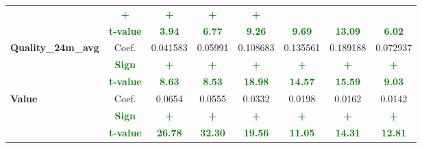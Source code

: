 \documentclass[11pt,english,a4paper,hidelinks]{book}
\begin{document}
\begin{table}[H]
\begin{tabular}{lccccccc}
                     & \textbf{\textcolor{green}{+}}
                     & \textbf{\textcolor{green}{+}}
                     & \textbf{\textcolor{green}{+}}
                     & \textbf{\textcolor{green}{+}} \\
            & \textbf{\textcolor{green}{t-value}}
                     & \textbf{\textcolor{green}{3.94}}
                     & \textbf{\textcolor{green}{6.77}}
                     & \textbf{\textcolor{green}{9.26}}
                     & \textbf{\textcolor{green}{9.69}}
                     & \textbf{\textcolor{green}{13.09}}
                     & \textbf{\textcolor{green}{6.02}} \\
        \midrule
        \multirow{3}{*}{\textbf{Quality\_24m\_avg}}
            & Coef.   & 0.041583  & 0.05991   & 0.108683  & 0.135561  & 0.189188  & 0.072937  \\
            & \textbf{\textcolor{green}{Sign}}
                     & \textbf{\textcolor{green}{+}}
                     & \textbf{\textcolor{green}{+}}
                     & \textbf{\textcolor{green}{+}}
                     & \textbf{\textcolor{green}{+}}
                     & \textbf{\textcolor{green}{+}}
                     & \textbf{\textcolor{green}{+}} \\
            & \textbf{\textcolor{green}{t-value}}
                     & \textbf{\textcolor{green}{8.63}}
                     & \textbf{\textcolor{green}{8.53}}
                     & \textbf{\textcolor{green}{18.98}}
                     & \textbf{\textcolor{green}{14.57}}
                     & \textbf{\textcolor{green}{15.59}}
                     & \textbf{\textcolor{green}{9.03}} \\
        \midrule
        \multirow{3}{*}{\textbf{Value}} 
            & Coef.   & 0.0654  & 0.0555  & 0.0332  & 0.0198  & 0.0162  & 0.0142 \\
            & \textbf{\textcolor{green}{Sign}}    & \textbf{\textcolor{green}{+}}       & \textbf{\textcolor{green}{+}}       & \textbf{\textcolor{green}{+}}       & \textbf{\textcolor{green}{+}}       & \textbf{\textcolor{green}{+}}       & \textbf{\textcolor{green}{+}}      \\
            & \textbf{\textcolor{green}{t-value}} & \textbf{\textcolor{green}{26.78}}   & \textbf{\textcolor{green}{32.30}}   & \textbf{\textcolor{green}{19.56}}   & \textbf{\textcolor{green}{11.05}}   & \textbf{\textcolor{green}{14.31}}   & \textbf{\textcolor{green}{12.81}}  \\
        \bottomrule
    \end{tabular}
    \label{tab:third_linear_regression_results_scores}
\end{table}
\end{document}
